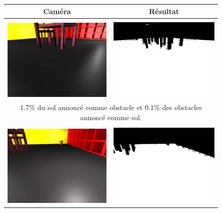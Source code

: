 \documentclass{article}
\begin{document}
\begin{figure}
    \begin{center}
        \begin{tabular}{|cc|}
            \hline
            \textbf{Caméra} & \textbf{Résultat} \\
            \hline & \\
            \includegraphics[width=0.4\linewidth]{rcs/abodv0s.png} & \includegraphics[width=0.4\linewidth]{rcs/abodv0r.png} \\
            \multicolumn{2}{|c|}{$1.7\%$ du sol annoncé comme obstacle et $0.1\%$ des obstacles annoncé comme sol.} \\
            \hline & \\
            \includegraphics[width=0.4\linewidth]{rcs/abodv1s.png} & \includegraphics[width=0.4\linewidth]{rcs/abodv1r.png} \\

\end{tabular}
\end{center}
\end{figure}
\end{document}

